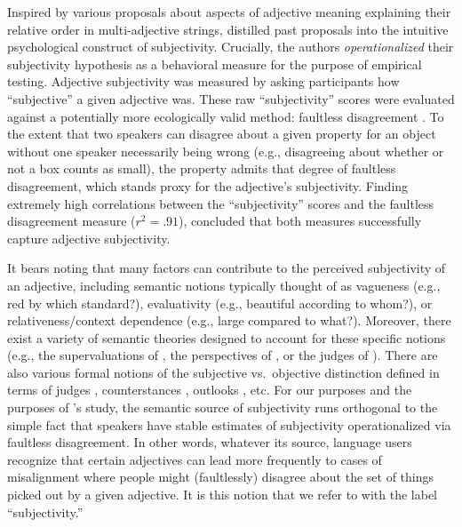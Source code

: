 \documentclass{sp}
\newcommand{\gcs}[1]{\textcolor{blue}{[gcs: #1]}}
\begin{document}
Inspired by various proposals about aspects of adjective meaning explaining their relative order in multi-adjective strings, \citeauthor{scontrasetal2017adjectives} distilled past proposals into the intuitive psychological construct of subjectivity. Crucially, the authors \emph{operationalized} their subjectivity hypothesis as a behavioral measure for the purpose of empirical testing. Adjective subjectivity was measured by asking participants how ``subjective'' a given adjective was. These raw ``subjectivity'' scores were evaluated against a potentially more ecologically valid method: faultless disagreement \citep[e.g.,][]{kolbel2004,macfarlane2014}. To the extent that two speakers can disagree about a given property for an object without one speaker necessarily being wrong (e.g., disagreeing about whether or not a box counts as small), the property admits that degree of faultless disagreement, which stands proxy for the adjective's subjectivity. Finding extremely high correlations between the ``subjectivity'' scores and the faultless disagreement measure ($r^2 = .91$), \citeauthor{scontrasetal2017adjectives} concluded that both measures successfully capture adjective subjectivity.

It bears noting that many factors can contribute to the perceived subjectivity of an adjective, including semantic notions typically thought of as vagueness (e.g., red by which standard?), evaluativity (e.g., beautiful according to whom?), or relativeness/context dependence (e.g., large compared to what?). Moreover, there exist a variety of semantic theories designed to account for these specific notions (e.g., the supervaluations of \citealt{kamppartee1995}, the perspectives of \citealt{kolbel2002}, or the judges of \citealt{lasersohn2005}). There are also various formal notions of the subjective vs.~objective distinction defined in terms of judges \citep{saebo2009}, counterstances \citep{kennedywiller2016}, outlooks \citep{coppock2018}, etc. For our purposes and the purposes of \citeauthor{scontrasetal2017adjectives}'s study, the semantic source of subjectivity runs orthogonal to the simple fact that speakers have stable estimates of subjectivity operationalized via faultless disagreement. In other words, whatever its source, language users recognize that certain adjectives can lead more frequently to cases of misalignment where people might (faultlessly) disagree about the set of things picked out by a given adjective. It is this notion that we refer to with the label ``subjectivity.''
\end{document}
